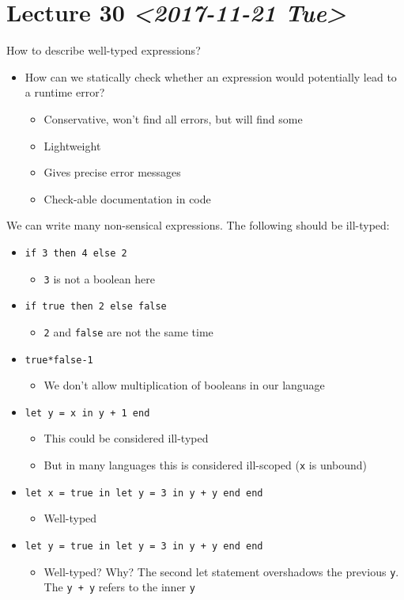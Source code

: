 \documentclass[11pt]{article}
\begin{document}
\section{Lecture 30 \textit{<2017-11-21 Tue>}}
\label{sec:org139700f}
How to describe well-typed expressions?
\begin{itemize}
\item How can we statically check whether an expression would potentially lead to a runtime error?
\begin{itemize}
\item Conservative, won't find all errors, but will find some
\item Lightweight
\item Gives precise error messages
\item Check-able documentation in code
\end{itemize}
\end{itemize}
We can write many non-sensical expressions. The following should be ill-typed:
\begin{itemize}
\item \texttt{if 3 then 4 else 2}
\begin{itemize}
\item \texttt{3} is not a boolean here
\end{itemize}
\item \texttt{if true then 2 else false}
\begin{itemize}
\item \texttt{2} and \texttt{false} are not the same time
\end{itemize}
\item \texttt{true*false-1}
\begin{itemize}
\item We don't allow multiplication of booleans in our language
\end{itemize}
\item \texttt{let y = x in y + 1 end}
\begin{itemize}
\item This could be considered ill-typed
\item But in many languages this is considered ill-scoped (\texttt{x} is unbound)
\end{itemize}
\item \texttt{let x = true in let y = 3 in y + y end end}
\begin{itemize}
\item Well-typed
\end{itemize}
\item \texttt{let y = true in let y = 3 in y + y end end}
\begin{itemize}
\item Well-typed? Why? The second let statement overshadows the previous \texttt{y}. The \texttt{y + y} refers to the inner \texttt{y}
\end{itemize}
\end{itemize}
\end{document}
